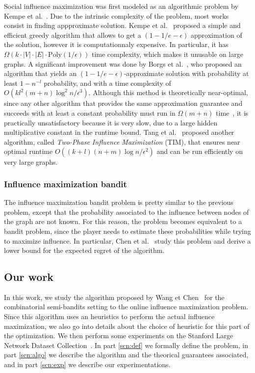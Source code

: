 \documentclass[a4paper,12pt]{article}
\begin{document}
Social influence maximization was first modeled as an algorithmic problem by Kempe et al.~\cite{kempe2003maximizing}. Due to the intrinsic complexity of the problem, most works consist in finding appproximate solution. Kempe et al.~\cite{kempe2003maximizing} proposed a simple and efficient greedy algorithm that allows to get a $(1-1/e-\epsilon)$ approximation of the solution, however it is computationnaly expensive. In particular, it has $\Omega(k\cdot|V|\cdot|E|\cdot\text{Poly}(1/\epsilon))$ time complexity, which makes it unusable on large graphs. A significant improvement was done by Borgs et al.~\cite{borgs2014maximizing}, who proposed an algorithm that yields an $(1-1/e-\epsilon)$-approximate solution with probability at least $1-n^{-l}$ probability, and with a time complexity of $O(kl^2(m+n)\log^2 n / \epsilon^3)$. Although this method is theoretically near-optimal, since any other algorithm that provides the same approximation guarantee and succeeds with at least a constant probability must run in $\Omega(m + n)$ time~\cite{borgs2014maximizing}, it is practically unsatisfactory because it is very slow, due to a large hidden multiplicative constant in the runtime bound. Tang et al.~\cite{tang2014influence} proposed another algorithm, called \emph{Two-Phase Influence Maximization} (TIM), that ensures near optimal runtime $O((k + l)(n + m) \log n/\epsilon^2)$ and can be run efficiently on very large graphs.

\subsubsection{Influence maximization bandit}

The influence maximization bandit problem is pretty similar to the previous problem, except that the probability associated to the influence between nodes of the graph are not known. For this reason, the problem becomes equivalent to a bandit problem, since the player needs to estimate these probabilities while trying to maximize influence. In particular, Chen et al.~\cite{chen2016combinatorial} study this problem and derive a lower bound for the expected regret of the algorithm.

\subsection{Our work}

In this work, we study the algorithm proposed by Wang et Chen~\cite{wang2017improving} for the combinatorial semi-bandits setting to the online influence maximization problem. Since this algorithm uses an heuristics to perform the actual influence maximization, we also go into details about the choice of heuristic for this part of the optimization. We then perform some experiments on the Stanford Large Network Dataset Collection~\cite{leskovec2015snap}. In part \ref{scn:def} we formally define the problem, in part \ref{scn:algo} we describe the algorithm and the theorical guarantees associated, and in part \ref{scn:exp} we describe our experimentations.
\end{document}
